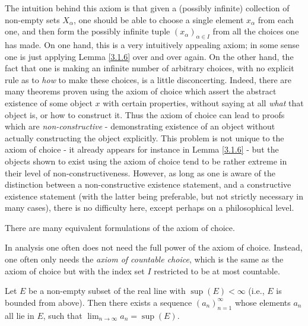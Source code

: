 \begin{remark}\label{8.4.3}
    The intuition behind this axiom is that given a (possibly infinite) collection of non-empty sets \(X_{\alpha}\), one should be able to choose a single element \(x_{\alpha}\) from each one, and then form the possibly infinite tuple \((x_{\alpha})_{\alpha \in I}\) from all the choices one has made.
    On one hand, this is a very intuitively appealing axiom;
    in some sense one is just applying Lemma \ref{3.1.6} over and over again.
    On the other hand, the fact that one is making an infinite number of arbitrary choices, with no explicit rule as to \emph{how} to make these choices, is a little disconcerting.
    Indeed, there are many theorems proven using the axiom of choice which assert the abstract existence of some object \(x\) with certain properties, without saying at all \emph{what} that object is, or how to construct it.
    Thus the axiom of choice can lead to proofs which are \emph{non-constructive} - demonstrating existence of an object without actually constructing the object explicitly.
    This problem is not unique to the axiom of choice - it already appears for instance in Lemma \ref{3.1.6} - but the objects shown to exist using the axiom of choice tend to be rather extreme in their level of non-constructiveness.
    However, as long as one is aware of the distinction between a non-constructive existence statement, and a constructive existence statement (with the latter being preferable, but not strictly necessary in many cases), there is no difficulty here, except perhaps on a philosophical level.
\end{remark}

\begin{remark}\label{8.4.4}
    There are many equivalent formulations of the axiom of choice.
\end{remark}

\begin{note}
    In analysis one often does not need the full power of the axiom of choice.
    Instead, one often only needs the \emph{axiom of countable choice}, which is the same as the axiom of choice but with the index set \(I\) restricted to be at most countable.
\end{note}

\begin{lemma}\label{8.4.5}
    Let \(E\) be a non-empty subset of the real line with \(\sup(E) < \infty\)
    (i.e., \(E\) is bounded from above).
    Then there exists a sequence \((a_n)_{n = 1}^\infty\) whose elements \(a_n\) all lie in \(E\), such that \(\lim_{n \to \infty} a_n = \sup(E)\).
\end{lemma}

